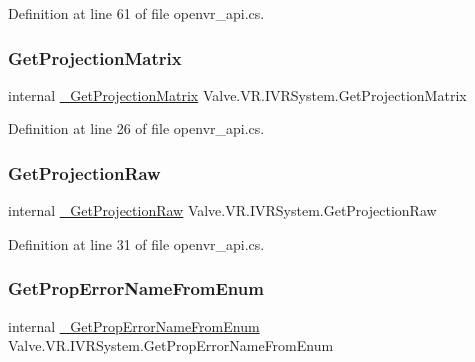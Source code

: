 Definition at line 61 of file openvr\+\_\+api.\+cs.

\mbox{\label{struct_valve_1_1_v_r_1_1_i_v_r_system_a28ccdb1a7ebc0cd67aa01fde5a09a29e}} 
\subsubsection{\texorpdfstring{GetProjectionMatrix}{GetProjectionMatrix}}
{\footnotesize\ttfamily internal \mbox{\hyperlink{struct_valve_1_1_v_r_1_1_i_v_r_system_a10aad034ee13b75116d84a989eced445}{\+\_\+\+Get\+Projection\+Matrix}} Valve.\+V\+R.\+I\+V\+R\+System.\+Get\+Projection\+Matrix}



Definition at line 26 of file openvr\+\_\+api.\+cs.

\mbox{\label{struct_valve_1_1_v_r_1_1_i_v_r_system_abc6c8a648793f141ae5cd8498887eb6d}} 
\subsubsection{\texorpdfstring{GetProjectionRaw}{GetProjectionRaw}}
{\footnotesize\ttfamily internal \mbox{\hyperlink{struct_valve_1_1_v_r_1_1_i_v_r_system_adb042a1d95520b0ab26f1f2c97d7dff4}{\+\_\+\+Get\+Projection\+Raw}} Valve.\+V\+R.\+I\+V\+R\+System.\+Get\+Projection\+Raw}



Definition at line 31 of file openvr\+\_\+api.\+cs.

\mbox{\label{struct_valve_1_1_v_r_1_1_i_v_r_system_a0456c00bd2ce6efef6e542ac99b933b4}} 
\subsubsection{\texorpdfstring{GetPropErrorNameFromEnum}{GetPropErrorNameFromEnum}}
{\footnotesize\ttfamily internal \mbox{\hyperlink{struct_valve_1_1_v_r_1_1_i_v_r_system_ab8df6803ff20af23449bb3a8951f75f8}{\+\_\+\+Get\+Prop\+Error\+Name\+From\+Enum}} Valve.\+V\+R.\+I\+V\+R\+System.\+Get\+Prop\+Error\+Name\+From\+Enum}



